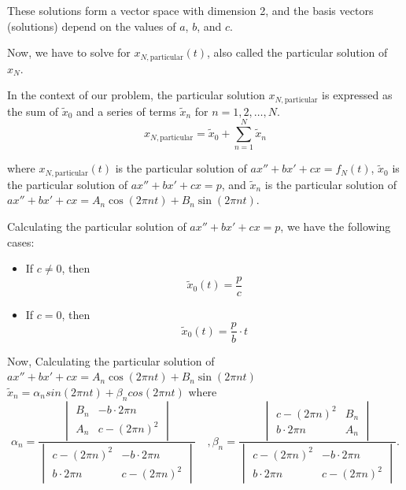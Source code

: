 \documentclass{article}
\begin{document}
These solutions form a vector space with dimension 2, and the basis vectors (solutions) depend on the values of \(a\), \(b\), and \(c\).

Now, we have to solve for \(x_{N,\text{particular}}(t)\), also called the particular solution of \(x_N\).

In the context of our problem, the particular solution \( x_{N,\text{particular}} \) is expressed as the sum of \( \tilde{x}_0 \) and a series of terms \( \tilde{x}_n \) for \( n = 1, 2, \ldots, N \).
\[ x_{N,\text{particular}} = \tilde{x}_0 + \sum_{n=1}^{N} \tilde{x}_n \]

where \( {x}_{N,\text{particular}}(t) \) is the particular solution of \(ax'' + bx' + cx = f_N(t)\), \( \widetilde{x}_0 \) is the particular solution of \(ax''+bx'+cx = p\), and \( \widetilde{x}_n \) is the particular solution of \(ax''+bx'+cx = A_n \cos(2 \pi n t) + B_n \sin(2 \pi n t)\).

Calculating the particular solution of \(ax''+bx'+cx = p\), we have the following cases:
\begin{itemize}
    \item If \(c \neq 0\), then
    \[
        \widetilde{x}
        _{0}(t) = \frac{p}{c}
    \]
    \item If \(c = 0\), then
    \[
        \widetilde{x}
        _{0}(t) = \frac{p}{b} \cdot t
    \]
\end{itemize}
Now, Calculating the particular solution of \(ax''+bx'+cx = A_n \cos(2 \pi n t) + B_n \sin(2 \pi n t)\)\\
$\widetilde{x}_n = \alpha_nsin(2\pi nt) + \beta_n cos(2\pi nt)$
where
\[
\alpha_n = \frac
{
\begin{vmatrix}
B_n & -b\cdot 2\pi n \\
A_n & c-(2\pi n)^2
\end{vmatrix}
}
{
\begin{vmatrix}
c-(2\pi n)^2 & -b\cdot 2\pi n \\
b\cdot 2\pi n & c-(2\pi n)^2
\end{vmatrix}   
} \quad,
\beta_n = \frac
{
\begin{vmatrix}
c-(2\pi n)^2 & B_n \\
b\cdot 2\pi n & A_n
\end{vmatrix}
}
{  
\begin{vmatrix}
c-(2\pi n)^2 & -b\cdot 2\pi n \\
b\cdot 2\pi n & c-(2\pi n)^2
\end{vmatrix}
}.
\]
\end{document}
